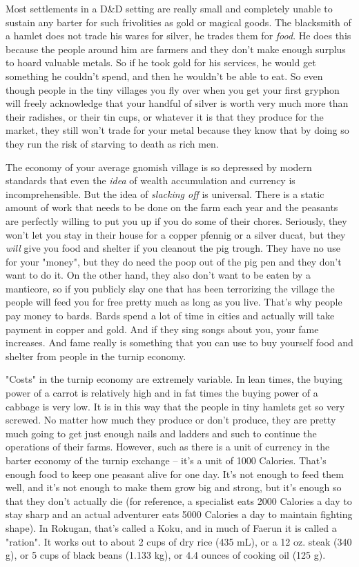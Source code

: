 Most settlements in a D\&D setting are really small and completely unable to sustain any barter for such frivolities as gold or magical goods. The blacksmith of a hamlet does not trade his wares for silver, he trades them for \textit{food}. He does this because the people around him are farmers and they don't make enough surplus to hoard valuable metals. So if he took gold for his services, he would get something he couldn't spend, and then he wouldn't be able to eat. So even though people in the tiny villages you fly over when you get your first gryphon will freely acknowledge that your handful of silver is worth very much more than their radishes, or their tin cups, or whatever it is that they produce for the market, they still won't trade for your metal because they know that by doing so they run the risk of starving to death as rich men.

The economy of your average gnomish village is so depressed by modern standards that even the \textit{idea} of wealth accumulation and currency is incomprehensible. But the idea of \textit{slacking off} is universal. There is a static amount of work that needs to be done on the farm each year and the peasants are perfectly willing to put you up if you do some of their chores. Seriously, they won't let you stay in their house for a copper pfennig or a silver ducat, but they \textit{will} give you food and shelter if you cleanout the pig trough. They have no use for your "money", but they do need the poop out of the pig pen and they don't want to do it. On the other hand, they also don't want to be eaten by a manticore, so if you publicly slay one that has been terrorizing the village the people will feed you for free pretty much as long as you live. That's why people pay money to bards. Bards spend a lot of time in cities and actually will take payment in copper and gold. And if they sing songs about you, your fame increases. And fame really is something that you can use to buy yourself food and shelter from people in the turnip economy.

"Costs" in the turnip economy are extremely variable. In lean times, the buying power of a carrot is relatively high and in fat times the buying power of a cabbage is very low. It is in this way that the people in tiny hamlets get so very screwed. No matter how much they produce or don't produce, they are pretty much going to get just enough nails and ladders and such to continue the operations of their farms. However, such as there is a unit of currency in the barter economy of the turnip exchange -- it's a unit of 1000 Calories. That's enough food to keep one peasant alive for one day. It's not enough to feed them well, and it's not enough to make them grow big and strong, but it's enough so that they don't actually die (for reference, a specialist eats 2000 Calories a day to stay sharp and an actual adventurer eats 5000 Calories a day to maintain fighting shape). In Rokugan, that's called a Koku, and in much of Faerun it is called a "ration". It works out to about 2 cups of dry rice (435 mL), or a 12 oz. steak (340 g), or 5 cups of black beans (1.133 kg), or 4.4 ounces of cooking oil (125 g).

